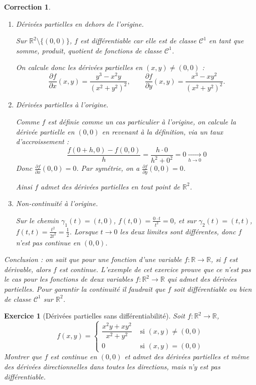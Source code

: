 \documentclass[11pt,a4paper]{article}
\newcommand{\Rr}{\mathbb{R}} \newcommand{\R}{\mathbb{R}}
\theoremstyle{exostyle}
\newtheorem{exo}{Exercice}
\newtheorem{cor}{Correction}
\newcommand{\exercice}[1]{} \newcommand{\finexercice}{}
\newcommand{\enonce}{\begin{exo}} \newcommand{\finenonce}{\end{exo}}
\newcommand{\correction}{\begin{cor}} \newcommand{\fincorrection}{\end{cor}}
\begin{document}
\correction
\begin{enumerate}
	\item Dérivées partielles en dehors de l'origine.
	
	Sur $\Rr^2 \setminus \{(0,0)\}$, $f$ est différentiable car elle est de classe $\mathcal{C}^1$ en tant que somme, produit, quotient de fonctions de classe $\mathcal{C}^1$.
	
	On calcule donc les dérivées partielles en $(x,y) \neq(0,0)$ :
	\[
	\frac{\partial f}{\partial x}(x,y) = \frac{y^3-x^2y}{(x^2 + y^2)^2}, \qquad \frac{\partial f}{\partial y}(x,y) = \frac{x^3 - xy^2}{(x^2 + y^2)^2}.
	\]
	
	\item  Dérivées partielles à l'origine.
	
	Comme $f$ est définie comme un cas particulier à l'origine, on calcule la dérivée partielle en $(0,0)$ en revenant à la définition, via un taux d'accroissement :
	\[
	 \frac{f(0+h, 0) - f(0, 0)}{h} = \frac{h \cdot 0}{h^2 + 0^2} = 0 \xrightarrow[h\to0]{} 0
	\]
	Donc $\frac{\partial f}{\partial x}(0,0) = 0$.
	Par symétrie, on a $\frac{\partial f}{\partial y}(0,0) = 0$. 
	
	Ainsi $f$ admet des dérivées partielles en tout point de $\Rr^2$.
	
	\item Non-continuité à l'origine.
	
	Sur le chemin $\gamma_1(t) = (t,0)$, $f(t,0) = \frac{0\cdot t}{t^2} = 0$,
	et sur $\gamma_2(t) = (t,t)$, $f(t,t) = \frac{t^2}{2t^2} = \frac12$.
	Lorsque $t\to0$ les deux limites sont différentes, donc $f$ n'est pas continue en $(0,0)$.
	
\end{enumerate}

\medskip

Conclusion : on sait que pour une fonction d'une variable $f :\Rr \to \Rr$, si $f$ est dérivable, alors $f$ est continue.
L'exemple de cet exercice prouve que ce n'est pas le cas pour les fonctions de deux variables $f :\Rr^2 \to \Rr$ qui admet des dérivées partielles.
Pour garantir la continuité il faudrait que $f$ soit différentiable ou bien de classe $\mathcal{C}^1$ sur $\Rr^2$.
\fincorrection
\finexercice


\exercice{1812, drutu, 2003/10/01}

\enonce[Dérivées partielles sans différentiabilité]
Soit $f:\R^2 \to \R $, 
$$
f(x,y)=\left\{ 
\begin{array}{cc}
	\dfrac{x^2y+xy^2}{x^2+y^2} & \mbox{ si }(x,y)\neq (0,0) \\[2ex]
	0 & \mbox{ si }(x,y)=(0,0) 
\end{array}
\right . 
$$
Montrer que $f$ est continue en $(0,0)$ et admet des dérivées partielles 
et même des dérivées directionnelles dans toutes les directions, mais n'y est pas différentiable.
\finenonce
\end{document}
